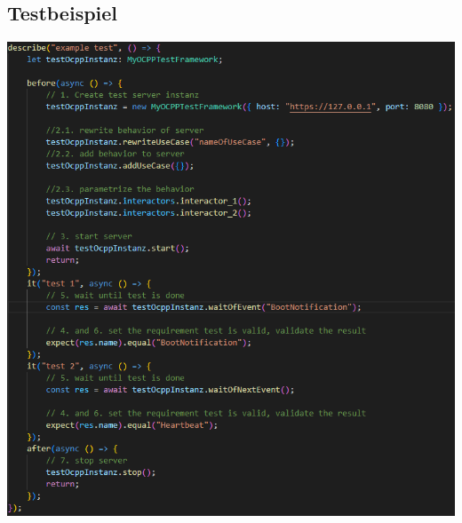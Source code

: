     \subsection{Testbeispiel}
    \includegraphics[width=1\textwidth,center]{Images/TestExample.png}\\[1cm]
